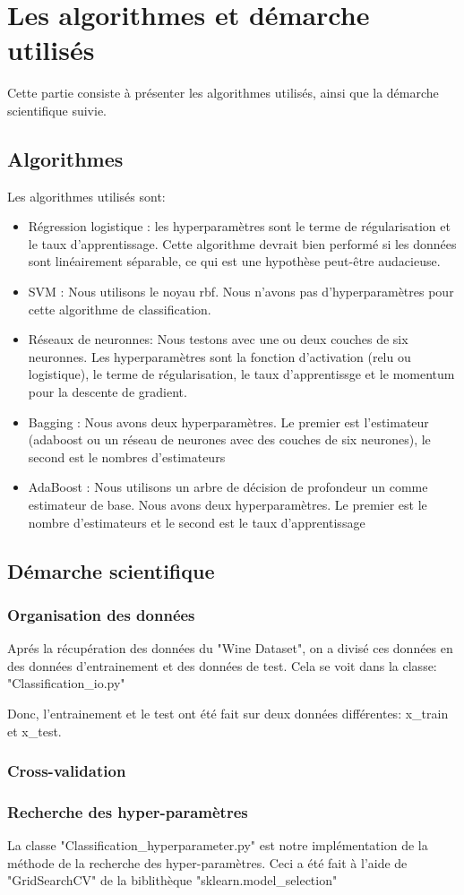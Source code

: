 \chapter{Les algorithmes et démarche utilisés}
\par Cette partie consiste à présenter les algorithmes utilisés, ainsi que la démarche scientifique suivie.
\section{Algorithmes}
Les algorithmes utilisés sont:
\begin{itemize}[label=\textbullet]
\item Régression logistique : les hyperparamètres sont le terme de régularisation et le taux d'apprentissage. Cette algorithme devrait bien performé si les données
    sont linéairement séparable, ce qui est une hypothèse peut-être audacieuse.
\item SVM : Nous utilisons le noyau rbf. Nous n'avons pas d'hyperparamètres pour cette algorithme de classification.
\item Réseaux de neuronnes: Nous testons avec une ou deux couches de six neuronnes. Les hyperparamètres sont la fonction d'activation (relu ou logistique), le terme
    de régularisation, le taux d'apprentissge et le momentum pour la descente de gradient.
\item Bagging : Nous avons deux hyperparamètres. Le premier est l'estimateur (adaboost ou un réseau de neurones avec des couches de six neurones), le second est le
    nombres d'estimateurs
\item AdaBoost : Nous utilisons un arbre de décision de profondeur un comme estimateur de base. Nous avons deux hyperparamètres. Le premier est le nombre
    d'estimateurs et le second est le taux d'apprentissage
\end{itemize}

\section{Démarche scientifique}
\subsection{Organisation des données}
\par Aprés la récupération des données du "Wine Dataset", on a divisé ces données en des données d'entrainement et des données de test. Cela se voit dans la classe: "Classification\_io.py"
\par Donc, l'entrainement et le test ont été fait sur deux données différentes: x\_train et x\_test.
\subsection{Cross-validation}

\subsection{Recherche des hyper-paramètres}
\par La classe "Classification\_hyperparameter.py" est notre implémentation de la méthode de la recherche des hyper-paramètres. Ceci a été fait à l'aide de "GridSearchCV" de la biblithèque "sklearn.model\_selection"



